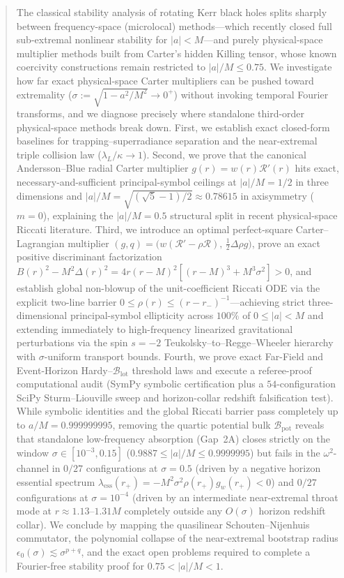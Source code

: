 \documentclass[11pt, a4paper]{article}
\theoremstyle{remark}
\begin{document}
\vspace{8pt}
\begin{abstract}
\noindent
The classical stability analysis of rotating Kerr black holes splits sharply between frequency-space (microlocal) methods---which recently closed full sub-extremal nonlinear stability for $|a| < M$---and purely physical-space multiplier methods built from Carter's hidden Killing tensor, whose known coercivity constructions remain restricted to $|a|/M \le 0.75$. We investigate how far exact physical-space Carter multipliers can be pushed toward extremality ($\sigma := \sqrt{1 - a^2/M^2} \to 0^+$) without invoking temporal Fourier transforms, and we diagnose precisely where standalone third-order physical-space methods break down. First, we establish exact closed-form baselines for trapping--superradiance separation and the near-extremal triple collision law ($\lambda_L / \kappa \to 1$). Second, we prove that the canonical Andersson--Blue radial Carter multiplier $g(r) = w(r)\mathcal{R}'(r)$ hits exact, necessary-and-sufficient principal-symbol ceilings at $|a|/M = 1/2$ in three dimensions and $|a|/M = \sqrt{(\sqrt{5}-1)/2} \approx 0.78615$ in axisymmetry ($m = 0$), explaining the $|a|/M = 0.5$ structural split in recent physical-space Riccati literature. Third, we introduce an optimal perfect-square Carter--Lagrangian multiplier $(g, q) = \big(w(\mathcal{R}' - \rho\mathcal{R}),\, \frac{1}{2}\Delta\rho g\big)$, prove an exact positive discriminant factorization $B(r)^2 - M^2\Delta(r)^2 = 4r(r-M)^2[(r-M)^3 + M^3\sigma^2] > 0$, and establish global non-blowup of the unit-coefficient Riccati ODE via the explicit two-line barrier $0 \le \rho(r) \le (r - r_-)^{-1}$---achieving strict three-dimensional principal-symbol ellipticity across $100\%$ of $0 \le |a| < M$ and extending immediately to high-frequency linearized gravitational perturbations via the spin $s = -2$ Teukolsky--to--Regge--Wheeler hierarchy with $\sigma$-uniform transport bounds. Fourth, we prove exact Far-Field and Event-Horizon Hardy--$\mathcal{B}_{\mathrm{lot}}$ threshold laws and execute a referee-proof computational audit (SymPy symbolic certification plus a $54$-configuration SciPy Sturm--Liouville sweep and horizon-collar redshift falsification test). While symbolic identities and the global Riccati barrier pass completely up to $a/M = 0.999999995$, removing the quartic potential bulk $\mathcal{B}_{\mathrm{pot}}$ reveals that standalone low-frequency absorption (Gap~2A) closes strictly on the window $\sigma \in [10^{-3}, 0.15]$ ($0.9887 \le |a|/M \le 0.9999995$) but fails in the $\omega^2$-channel in $0/27$ configurations at $\sigma = 0.5$ (driven by a negative horizon essential spectrum $\lambda_{\mathrm{ess}}(r_+) = -M^2\sigma^2\rho(r_+)g_w(r_+) < 0$) and $0/27$ configurations at $\sigma = 10^{-4}$ (driven by an intermediate near-extremal throat mode at $r \approx 1.13\text{--}1.31M$ completely outside any $O(\sigma)$ horizon redshift collar). We conclude by mapping the quasilinear Schouten--Nijenhuis commutator, the polynomial collapse of the near-extremal bootstrap radius $\epsilon_0(\sigma) \lesssim \sigma^{p+q}$, and the exact open problems required to complete a Fourier-free stability proof for $0.75 < |a|/M < 1$.


\end{abstract}
\end{document}
